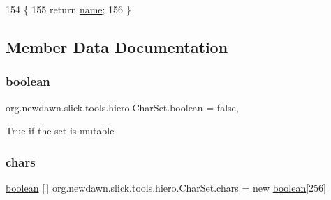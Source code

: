 \begin{DoxyCode}
154                              \{
155         \textcolor{keywordflow}{return} \mbox{\hyperlink{classorg_1_1newdawn_1_1slick_1_1tools_1_1hiero_1_1_char_set_aff26a369817bc815327582f0b7ac215e}{name}};
156     \}
\end{DoxyCode}


\subsection{Member Data Documentation}
\mbox{\label{classorg_1_1newdawn_1_1slick_1_1tools_1_1hiero_1_1_char_set_a45913b69f90ce574d65a9023e9d1257c}} 
\subsubsection{\texorpdfstring{boolean}{boolean}}
{\footnotesize\ttfamily org.\+newdawn.\+slick.\+tools.\+hiero.\+Char\+Set.\+boolean = false\hspace{0.3cm}{\ttfamily [mutable]}, {\ttfamily [private]}}

True if the set is mutable \mbox{\label{classorg_1_1newdawn_1_1slick_1_1tools_1_1hiero_1_1_char_set_abc7c29b42b721d99a1cfc9d2ae97de07}} 
\subsubsection{\texorpdfstring{chars}{chars}}
{\footnotesize\ttfamily \mbox{\hyperlink{classorg_1_1newdawn_1_1slick_1_1tools_1_1hiero_1_1_char_set_a45913b69f90ce574d65a9023e9d1257c}{boolean}} \mbox{[}$\,$\mbox{]} org.\+newdawn.\+slick.\+tools.\+hiero.\+Char\+Set.\+chars = new \mbox{\hyperlink{classorg_1_1newdawn_1_1slick_1_1tools_1_1hiero_1_1_char_set_a45913b69f90ce574d65a9023e9d1257c}{boolean}}\mbox{[}256\mbox{]}\hspace{0.3cm}{\ttfamily [private]}}

